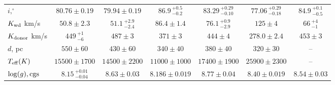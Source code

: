 \begin{landscape}
\begin{table}
\begin{tabular}{lcccccc}
            $i, ^\circ$                 & $80.76\pm0.19$                    & $79.94\pm0.19$                & $86.9\,^{+0.5}_{-0.2}$        & $83.29\,^{+0.29}_{-0.10}$     & $77.06\,^{+0.29}_{-0.18}$         & $84.9\,^{+0.1}_{-0.5}$            \\
            $K_{\rm wd}$ km/s           & $50.8\pm2.3$                      & $51.1\,^{+2.9}_{-2.4}$        & $86.4\pm1.4$                  & $76.1\,^{+0.9}_{-2.9}$        & $125\pm4$                         & $66\,^{+4}_{-1}$                  \\
            $K_{\rm donor}$ km/s        & $449\,^{+1}_{-6}$                 & $487\pm3$                     & $371\pm3$                     & $444\pm4$                     & $278.0\pm2.4$                     & $453\pm3$                         \\
            \hline
            $d$, pc                     & $550\pm60$                        & $430\pm60$                & $340\pm40$                        & $380\pm40$                    & $320\pm30$                        & --                                \\
            $T_{\rm eff} (K)$           & $15500\pm1700$                    & $14500\pm2200$            & $11000\pm1000$                    & $17400\pm1900$                & $25900\pm2300$                    & --                                \\
            $\log(g), {\rm cgs}$        & $8.15\,^{+0.01}_{-0.04}$          & $8.63\pm0.03$             & $8.186\pm0.019$                   & $8.77\pm0.04$                 & $8.40\pm0.019$                    & $8.54\pm0.03$                     \\
            \hline \hline
        \end{tabular}
    \end{table}


\end{landscape}
